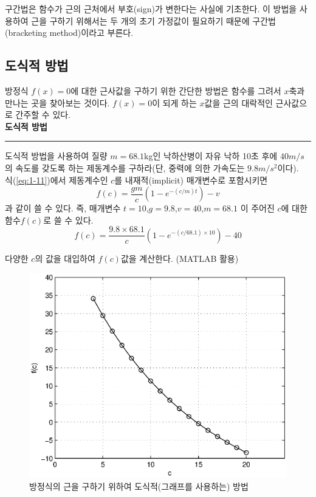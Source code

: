 구간법은 함수가 근의 근처에서 부호(sign)가 변한다는 사실에 기초한다. 이 방법을 사용하여 근을 구하기 위해서는 두 개의 초기 가정값이 필요하기 때문에 구간법(bracketing method)이라고 부른다.

\subsection{도식적 방법}
방정식 $f(x)=0$에 대한 근사값을 구하기 위한 간단한 방법은 함수를 그려서 $x$축과 만나는 곳을 찾아보는 것이다. $f(x)=0$이 되게 하는 $x$값을 근의 대락적인 근사값으로 간주할 수 있다.
\\
 \textbf{도식적 방법}\\
\rule{\textwidth}{0.1pt}
도식적 방법을 사용하여 질량 $m=68.1$kg인 낙하산병이 자유 낙하 10초 후에 $40m/s$의 속도를 갖도록 하는 제동계수를 구하라(단, 중력에 의한 가속도는 $9.8m/s^2$이다).
\\
식(\ref{eq:1-11})에서 제동계수인 $c$를 내재적(implicit) 매개변수로 포함시키면
\begin{equation}
f(c)=\frac{gm}{c}\left(1-e^{-(c/m)t}\right)-v
\end{equation}
과 같이 쓸 수 있다. 즉, 매개변수 $t=10$,$g=9.8$,$v=40$,$m=68.1$ 이 주어진 $c$에 대한 함수$f(c)$로 쓸 수 있다.
\begin{equation}
f(c)=\frac{9.8\times68.1}{c}\left(1-e^{-(c/68.1)\times10}\right)-40
\label{eq:e5-1-1}
\end{equation}

다양한 $c$의 값을 대입하여 $f(c)$값을 계산한다. (MATLAB 활용)
 
\begin{figure}[!hbpt]
\centering
\includegraphics[keepaspectratio=true,width=0.8\linewidth]{figs/5-1.eps}
\caption{방정식의 근을 구하기 위하여 도식적(그래프를 사용하는) 방법}
\label{fig:5-1}
\end{figure}


